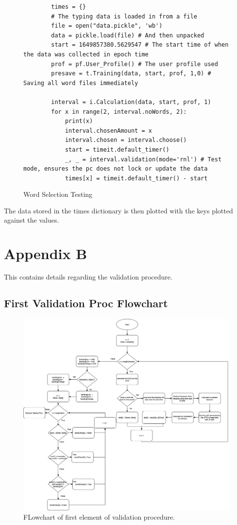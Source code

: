 \documentclass[10pt,a4paper]{report}
\begin{document}
\begin{figure}[h!]
	\begin{lstlisting}
		times = {}
		# The typing data is loaded in from a file
		file = open("data.pickle", 'wb')
		data = pickle.load(file) # And then unpacked
		start = 1649857380.5629547 # The start time of when the data was collected in epoch time
		prof = pf.User_Profile() # The user profile used
		presave = t.Training(data, start, prof, 1,0) # Saving all word files immediately
		
		interval = i.Calculation(data, start, prof, 1)
		for x in range(2, interval.noWords, 2):
			print(x)
			interval.chosenAmount = x
			interval.chosen = interval.choose()
			start = timeit.default_timer()
			_, _ = interval.validation(mode='rnl') # Test mode, ensures the pc does not lock or update the data
			times[x] = timeit.default_timer() - start
	\end{lstlisting}
	\caption{Word Selection Testing}
	\label{fig:selTest}
\end{figure}

The data stored in the times dictionary is then plotted with the keys plotted against the values.

\chapter*{Appendix B}

This contains details regarding the validation procedure.

\section*{First Validation Proc Flowchart}

\begin{figure}
	\centering
	\includegraphics[scale=0.30]{ValidationProc}
	\caption{FLowchart of first element of validation procedure.}
	\label{fig:valProc}
\end{figure}
\end{document}
